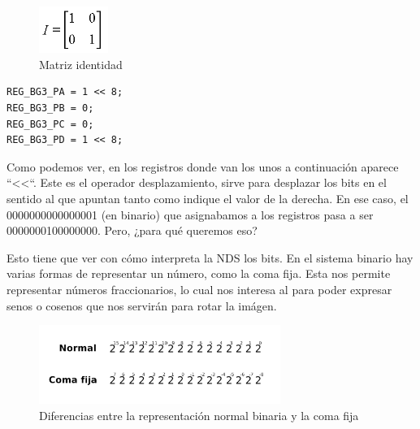 \vspace{0.5cm}

\begin{figure}[htbp]
\centering
  \includegraphics[width=0.2\textwidth]{archivos/matrizid.png}
  \caption{Matriz identidad}
  \label{fig:idmatr}
\end{figure}

\vspace{0.5cm}

\begin{lstlisting}[caption={Registros de control para la matriz afín de los fondos}, label={code:gameloop}]
REG_BG3_PA = 1 << 8;
REG_BG3_PB = 0;
REG_BG3_PC = 0;
REG_BG3_PD = 1 << 8;
\end{lstlisting}

\vspace{0.5cm}

Como podemos ver, en los registros donde van los unos a continuación aparece ``<<``. Este es el operador desplazamiento, sirve para desplazar los bits en el sentido al que apuntan tanto como indique el valor de la derecha. En ese caso, el 0000000000000001 (en binario) que asignabamos a los registros pasa a ser 0000000100000000. Pero, ¿para qué queremos eso?

\vspace{0.5cm}

Esto tiene que ver con cómo interpreta la NDS los bits. En el sistema binario hay varias formas de representar un número, como la coma fija. Esta nos permite representar números fraccionarios, lo cual nos interesa al para poder expresar senos o cosenos que nos servirán para rotar la imágen.

\vspace{0.5cm}

\begin{figure}[htbp]
\centering
  \includegraphics[width=0.7\textwidth]{archivos/comafija.png}
  \caption{Diferencias entre la representación normal binaria y la coma fija}
  \label{fig:}
\end{figure}

